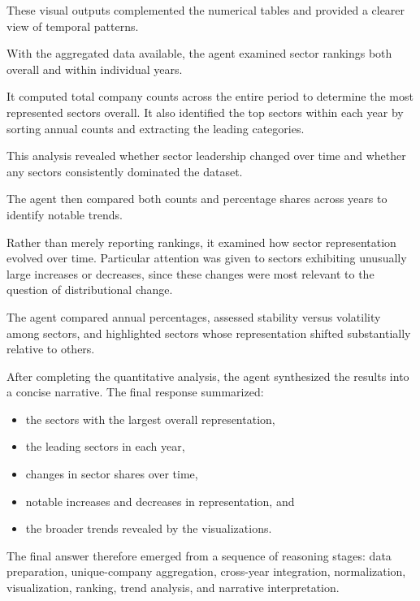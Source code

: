 These visual outputs complemented the numerical tables and provided a clearer view of temporal patterns.


With the aggregated data available, the agent examined sector rankings both overall and within individual years.

It computed total company counts across the entire period to determine the most represented sectors overall. It also identified the top sectors within each year by sorting annual counts and extracting the leading categories.

This analysis revealed whether sector leadership changed over time and whether any sectors consistently dominated the dataset.


The agent then compared both counts and percentage shares across years to identify notable trends.

Rather than merely reporting rankings, it examined how sector representation evolved over time. Particular attention was given to sectors exhibiting unusually large increases or decreases, since these changes were most relevant to the question of distributional change.

The agent compared annual percentages, assessed stability versus volatility among sectors, and highlighted sectors whose representation shifted substantially relative to others.


After completing the quantitative analysis, the agent synthesized the results into a concise narrative. The final response summarized:

\begin{itemize}
  \item the sectors with the largest overall representation,
  \item the leading sectors in each year,
  \item changes in sector shares over time,
  \item notable increases and decreases in representation, and
  \item the broader trends revealed by the visualizations.
\end{itemize}

The final answer therefore emerged from a sequence of reasoning stages: data preparation, unique-company aggregation, cross-year integration, normalization, visualization, ranking, trend analysis, and narrative interpretation.
